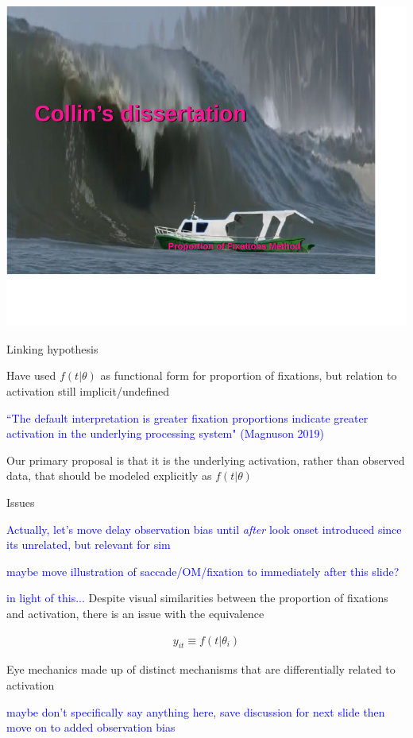 \documentclass{beamer}
\newcommand{\vp}{\vspace{2mm}}
\providecommand{\cn}[1]{\textcolor{blue}{#1}}
\begin{document}
\begin{frame}
\begin{center}
\includegraphics[scale=1]{boat_meme.pdf}
\end{center}
\end{frame}

\begin{frame}{Linking hypothesis}\Large

Have used $f(t|\theta)$ as functional form for proportion of fixations, but relation to activation still implicit/undefined \vp

\cn{``The default interpretation is greater fixation proportions indicate greater activation in the underlying processing system" (Magnuson 2019)} \vp


Our primary proposal is that it is the underlying activation, rather than observed data, that should be modeled explicitly as $f(t|\theta)$ \vp


\end{frame}

\begin{frame}{Issues}

\cn{Actually, let's move delay observation bias until \textit{after} look onset introduced since its unrelated, but relevant for sim}

\cn{maybe move illustration of saccade/OM/fixation to immediately after this slide?}

\cn{in light of this...} Despite visual similarities between the proportion of fixations and activation, there is an issue with the equivalence

\begin{align*}
y_{it} \equiv f(t | \theta_i)
\end{align*}

Eye mechanics made up of distinct mechanisms that are differentially related to activation \vp

\cn{maybe don't specifically say anything here, save discussion for next slide then move on to added observation bias}

\end{frame}
\end{document}
